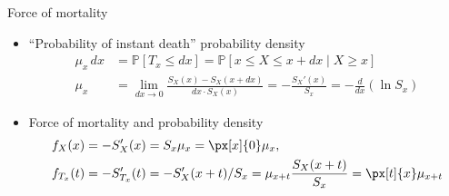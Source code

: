 Force of mortality
\begin{itemize}
\item ``Probability of instant death'' probability density
\begin{align*}
\mu_x\,dx &= \mathbb{P}[T_x\leq dx] = \mathbb{P}[x\leq X\leq x + dx\mid X\geq x] \\
\mu_x &= \lim_{dx\to 0}\frac{S_X(x) - S_X(x + dx)}{dx\cdot S_X(x)} = -\frac{S_X'(x)}{S_x} = -\frac{d}{dx}(\ln S_x)
\end{align*}
\item Force of mortality and probability density
\begin{align*}
f_X(x) &= -S_X'(x) = S_x\mu_x = \px[x]{0}\mu_x, \\
f_{T_x}(t) &= -S_{T_x}'(t) = -S_X'(x + t)/S_x = \mu_{x + t}\frac{S_X(x + t)}{S_x} = \px[t]{x}\mu_{x + t}
\end{align*}
\end{itemize}